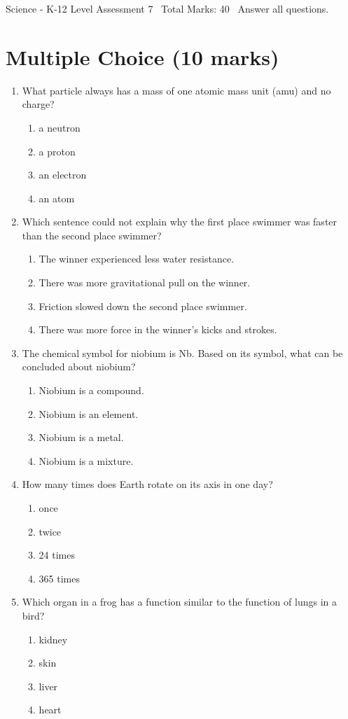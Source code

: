 \documentclass[12pt]{article}
\begin{document}
\begin{center}
Science - K-12 Level Assessment 7 \
Total Marks: 40 \
Answer all questions.
\end{center}

\section*{Multiple Choice (10 marks)}
\begin{enumerate}[label=\arabic*.]
\item What particle always has a mass of one atomic mass unit (amu) and no charge?
\begin{enumerate}[label=(\alph*)]
    \item a neutron
    \item a proton
    \item an electron
    \item an atom
\end{enumerate}
\item Which sentence could not explain why the first place swimmer was faster than the second place swimmer?
\begin{enumerate}[label=(\alph*)]
    \item The winner experienced less water resistance.
    \item There was more gravitational pull on the winner.
    \item Friction slowed down the second place swimmer.
    \item There was more force in the winner's kicks and strokes.
\end{enumerate}
\item The chemical symbol for niobium is Nb. Based on its symbol, what can be concluded about niobium?
\begin{enumerate}[label=(\alph*)]
    \item Niobium is a compound.
    \item Niobium is an element.
    \item Niobium is a metal.
    \item Niobium is a mixture.
\end{enumerate}
\item How many times does Earth rotate on its axis in one day?
\begin{enumerate}[label=(\alph*)]
    \item once
    \item twice
    \item 24 times
    \item 365 times
\end{enumerate}
\item Which organ in a frog has a function similar to the function of lungs in a bird?
\begin{enumerate}[label=(\alph*)]
    \item kidney
    \item skin
    \item liver
    \item heart
\end{enumerate}
\end{enumerate}
\end{document}

